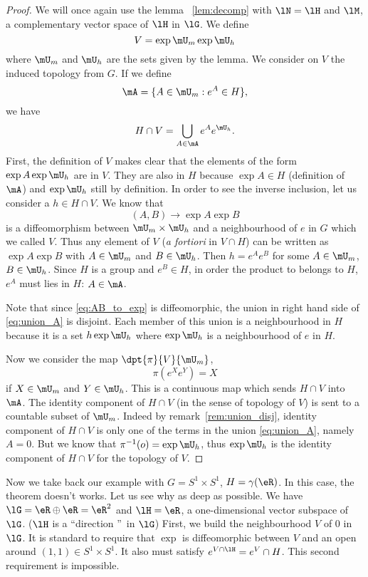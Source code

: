\begin{proof}
We will once again use the lemma ~\ref{lem:decomp} with $\lN=\lH$ and $\lM$, a complementary vector space of $\lH$ in $\lG$. We define
\[
   V=\exp\mU_m\exp\mU_h
\]
where $\mU_m$ and $\mU_h$ are the sets given by the lemma. We consider on $V$ the induced topology from $G$. If we define
\[
   \mA=\{A\in\mU_m:e^{A}\in H\},
\]
we have
\begin{equation}\label{eq:union_A}
   H\cap V=\bigcup_{A\in\mA}e^{A}e^{\mU_h}.
\end{equation}
First, the definition of $V$ makes clear that the elements of the form $\exp A\exp\mU_h$ are in $V$. They are also in $H$ because $\exp A\in H$ (definition of $\mA$) and $\exp\mU_h$ still by definition. In order to see the inverse inclusion, let us consider a $h\in H\cap V$. We know that
\begin{equation}\label{eq:AB_to_exp}
(A,B)\to\exp A\exp B
\end{equation}
is a diffeomorphism between $\mU_m\times\mU_h$ and a neighbourhood of $e$ in $G$ which we called $V$. Thus any element of $V$ (\emph{a fortiori} in $V\cap H$) can be written as $\exp A\exp B$ with $A\in\mU_m$ and $B\in\mU_h$. Then $h=e^Ae^B$ for some $A\in\mU_m$, $B\in\mU_h$. Since $H$ is a group and $e^B\in H$, in order the product to belongs to $H$, $e^A$ must lies in $H$: $A\in\mA$.

\begin{remark}\label{rem:union_disj}
Note that since \eqref{eq:AB_to_exp} is diffeomorphic, the union in right hand side of \eqref{eq:union_A} is disjoint. Each member of this union is a neighbourhood in $H$ because it is a set $h\exp\mU_h$ where $\exp\mU_h$ is a neighbourhood of $e$ in $H$.
\end{remark}

Now we consider the map $\dpt{\pi}{V}{\mU_m}$,
\[
  \pi(e^{X}e^Y)=X
\]
if $X\in\mU_m$ and $Y\in\mU_h$. This is a continuous map which sends $H\cap V$ into $\mA$. The identity component of $H\cap V$ (in the sense of topology of $V$) is sent to a countable subset of $\mU_m$. Indeed by remark~\ref{rem:union_disj}, identity component of $H\cap V$ is only one of the terms in the union \eqref{eq:union_A}, namely $A=0$. But we know that $\pi^{-1}(o)=\exp\mU_h$, thus $\exp\mU_h$ is the identity component of $H\cap V$ for the topology of $V$.
\end{proof}



Now we take back our example with $G=S^1\times S^1$, $H=\gamma(\eR)$. In this case, the theorem doesn't works. Let us see why as deep as possible. We have $\lG=\eR\oplus\eR=\eR^2$ and $\lH=\eR$, a one-dimensional vector subspace of $\lG$. ($\lH$ is a ``direction ''\ in $\lG$) First, we build the neighbourhood $V$ of $0$ in $\lG$. It is standard to require that $\exp$ is diffeomorphic between $V$ and an open around $(1,1)\in S^1\times S^1$. It also must satisfy $e^{V\cap\lH}=e^V\cap H$. This second requirement is impossible.

